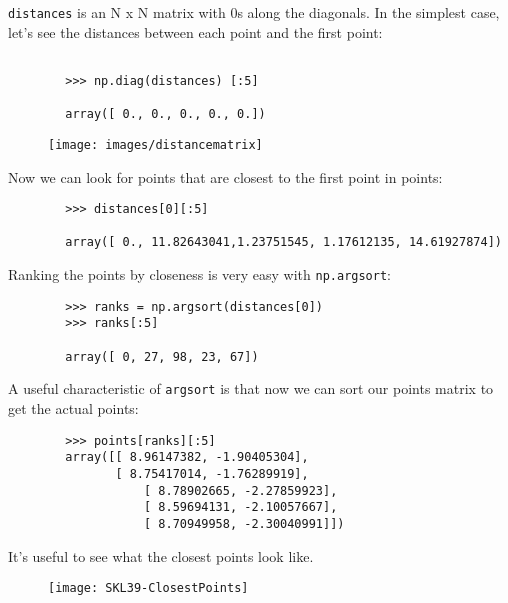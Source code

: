 \documentclass[SKL-MASTER.tex]{subfiles}
\begin{document}
	\noindent \texttt{distances} is an N x N matrix with 0s along the diagonals. In the simplest case, let's see the
	distances between each point and the first point:
	
	\begin{framed}
		\begin{verbatim}
		
		>>> np.diag(distances) [:5]
		
		array([ 0., 0., 0., 0., 0.])
		\end{verbatim}
	\end{framed}
	\begin{figure}[h!]
\centering
\texttt{[image: images/distancematrix]}
\end{figure}

	Now we can look for points that are closest to the first point in points:
	{\large
	\begin{framed}
		\begin{verbatim}
		>>> distances[0][:5]
		
		array([ 0., 11.82643041,1.23751545, 1.17612135, 14.61927874])
		\end{verbatim}
	\end{framed}
}
	Ranking the points by closeness is very easy with \texttt{np.argsort}:
	\begin{framed}
		\begin{verbatim}
		>>> ranks = np.argsort(distances[0])
		>>> ranks[:5]
		
		array([ 0, 27, 98, 23, 67])
		\end{verbatim}
	\end{framed}
	A useful characteristic of \texttt{argsort} is that now we can sort our points matrix to get the
	actual points:
	\begin{framed}
		\begin{verbatim}
		>>> points[ranks][:5]
	    array([[ 8.96147382, -1.90405304],
	           [ 8.75417014, -1.76289919],
		           [ 8.78902665, -2.27859923],
		           [ 8.59694131, -2.10057667],
		           [ 8.70949958, -2.30040991]])
		\end{verbatim}
	\end{framed}
	It's useful to see what the closest points look like. 
	
	\begin{figure}
		\centering
		\texttt{[image: SKL39-ClosestPoints]}
		\caption{}
		\label{fig:SKL39-ClosestPoints}
	\end{figure}
	
\end{document}
